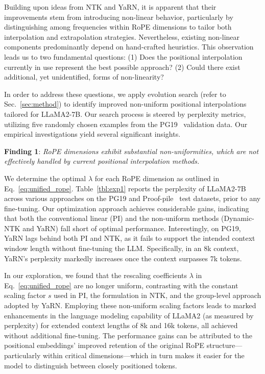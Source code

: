 Building upon ideas from NTK and YaRN, it is apparent that their improvements stem from introducing non-linear behavior, particularly by distinguishing among frequencies within RoPE dimensions to tailor both interpolation and extrapolation strategies. Nevertheless, existing non-linear components predominantly depend on hand-crafted heuristics. This observation leads us to two fundamental questions: (1) Does the positional interpolation currently in use represent the best possible approach? (2) Could there exist additional, yet unidentified, forms of non-linearity?

In order to address these questions, we apply evolution search (refer to Sec.~\ref{sec:method}) to identify improved non-uniform positional interpolations tailored for LLaMA2-7B. Our search process is steered by perplexity metrics, utilizing five randomly chosen examples from the PG19~\cite{pg19} validation data. Our empirical investigations yield several significant insights.

\textbf{Finding 1}: \textit{RoPE dimensions exhibit substantial non-uniformities, which are not effectively handled by current positional interpolation methods.}

We determine the optimal $\lambda$ for each RoPE dimension as outlined in Eq.~\ref{eq:unified_rope}. Table~\ref{tbl:exp1} reports the perplexity of LLaMA2-7B across various approaches on the PG19 and Proof-pile~\cite{proof-pile} test datasets, prior to any fine-tuning. Our optimization approach achieves considerable gains, indicating that both the conventional linear (PI) and the non-uniform methods (Dynamic-NTK and YaRN) fall short of optimal performance. Interestingly, on PG19, YaRN lags behind both PI and NTK, as it fails to support the intended context window length without fine-tuning the LLM. Specifically, in an 8k context, YaRN’s perplexity markedly increases once the context surpasses 7k tokens.

In our exploration, we found that the rescaling coefficients $\lambda$ in Eq.~\ref{eq:unified_rope} are no longer uniform, contrasting with the constant scaling factor $s$ used in PI, the formulation in NTK, and the group-level approach adopted by YaRN. Employing these non-uniform scaling factors leads to marked enhancements in the language modeling capability of LLaMA2 (as measured by perplexity) for extended context lengths of 8k and 16k tokens, all achieved without additional fine-tuning. The performance gains can be attributed to the positional embeddings' improved retention of the original RoPE structure—particularly within critical dimensions—which in turn makes it easier for the model to distinguish between closely positioned tokens.

